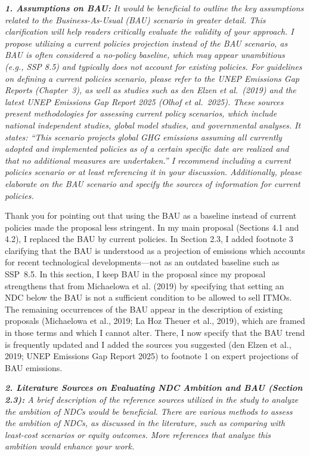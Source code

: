 \documentclass[11pt]{article}
\newenvironment{italic}{\itshape}{\par}
\begin{document}
\begin{italic}
\textbf{1. Assumptions on BAU:} It would be beneficial to outline the key assumptions related to the Business-As-Usual (BAU) scenario in greater detail. This clarification will help readers critically evaluate the validity of your approach. I propose utilizing a current policies projection instead of the BAU scenario, as BAU is often considered a no-policy baseline, which may appear unambitious (e.g., SSP 8.5) and typically does not account for existing policies. For guidelines on defining a current policies scenario, please refer to the UNEP Emissions Gap Reports (Chapter~3), as well as studies such as den Elzen et al.\ (2019) and the latest UNEP Emissions Gap Report 2025 (Olhof et al.\ 2025). These sources present methodologies for assessing current policy scenarios, which include national independent studies, global model studies, and governmental analyses. It states: ``This scenario projects global GHG emissions assuming all currently adopted and implemented policies as of a certain specific date are realized and that no additional measures are undertaken.'' I recommend including a current policies scenario or at least referencing it in your discussion. Additionally, please elaborate on the BAU scenario and specify the sources of information for current policies.
\end{italic}

Thank you for pointing out that using the BAU as a baseline instead of current policies made the proposal less stringent. In my main proposal (Sections 4.1 and 4.2), I replaced the BAU by current policies. In Section 2.3, I added footnote 3 clarifying that the BAU is understood as a projection of emissions which accounts for recent technological developments---not as an outdated baseline such as SSP~8.5. In this section, I keep BAU in the proposal since my proposal strengthens that from Michaelowa et al. (2019) by specifying that setting an NDC below the BAU is not a sufficient condition to be allowed to sell ITMOs. The remaining occurrences of the BAU appear in the description of existing proposals (Michaelowa et al., 2019; La Hoz Theuer et al., 2019), which are framed in those terms and which I cannot alter. There, I now specify that the BAU trend is frequently updated and I added the sources you suggested (den Elzen et al., 2019; UNEP Emissions Gap Report 2025) to footnote 1 on expert projections of BAU emissions.




\begin{italic}
\textbf{2. Literature Sources on Evaluating NDC Ambition and BAU (Section 2.3):} A brief description of the reference sources utilized in the study to analyze the ambition of NDCs would be beneficial. There are various methods to assess the ambition of NDCs, as discussed in the literature, such as comparing with least-cost scenarios or equity outcomes. More references that analyze this ambition would enhance your work.
\end{italic}
\end{document}
